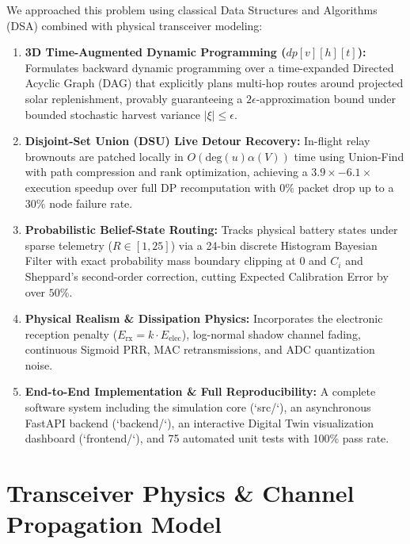 \documentclass[journal]{IEEEtran}
\begin{document}
We approached this problem using classical Data Structures and Algorithms (DSA) combined with physical transceiver modeling:
\begin{enumerate}
    \item \textbf{3D Time-Augmented Dynamic Programming ($dp[v][h][t]$):} Formulates backward dynamic programming over a time-expanded Directed Acyclic Graph (DAG) that explicitly plans multi-hop routes around projected solar replenishment, provably guaranteeing a $2\epsilon$-approximation bound under bounded stochastic harvest variance $|\xi| \le \epsilon$.
    \item \textbf{Disjoint-Set Union (DSU) Live Detour Recovery:} In-flight relay brownouts are patched locally in $O(\text{deg}(u)\alpha(V))$ time using Union-Find with path compression and rank optimization, achieving a $3.9\times - 6.1\times$ execution speedup over full DP recomputation with $0\%$ packet drop up to a $30\%$ node failure rate.
    \item \textbf{Probabilistic Belief-State Routing:} Tracks physical battery states under sparse telemetry ($R \in [1, 25]$) via a 24-bin discrete Histogram Bayesian Filter with exact probability mass boundary clipping at 0 and $C_i$ and Sheppard's second-order correction, cutting Expected Calibration Error by over $50\%$.
    \item \textbf{Physical Realism & Dissipation Physics:} Incorporates the electronic reception penalty ($E_{\text{rx}} = k \cdot E_{\text{elec}}$), log-normal shadow channel fading, continuous Sigmoid PRR, MAC retransmissions, and ADC quantization noise.
    \item \textbf{End-to-End Implementation & Full Reproducibility:} A complete software system including the simulation core (`src/`), an asynchronous FastAPI backend (`backend/`), an interactive Digital Twin visualization dashboard (`frontend/`), and 75 automated unit tests with 100\% pass rate.
\end{enumerate}

\section{Transceiver Physics \& Channel Propagation Model}
\end{document}
